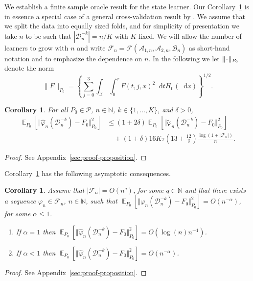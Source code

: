 \documentclass{statsoc}
\numberwithin{theorem}{section}
\newtheorem{corollary}[theorem]{Corollary}
\DeclareMathOperator{\E}{\mathbb{E}} %
\newcommand{\N}{\mathbb{N}}
\newcommand{\blank}{\makebox[1ex]{\textbf{$\cdot$}}}
\renewcommand{\phi}{\varphi}
\newcommand*\diff{\mathop{}\!\mathrm{d}}
\newcommand\bigO{\textit{O}}
\newcommand{\1}{\mathds{1}}
\newcommand{\data}{\ensuremath{\mathcal{D}}}
\begin{document}
We establish a finite sample oracle result for the state learner.
Our Corollary~\ref{cor:oracle-prop} is in essence a special case of a
general cross-validation result by \cite{vaart2006oracle}. We assume
that we split the data into equally sized folds, and for simplicity of
presentation we take \( n \) to be such that
\( |\data_n^{-k}| = n/K \) with \( K \) fixed. We will allow the
number of learners to grow with \( n \) and write
\( \mathcal{F}_n=\mathcal{F}(\mathcal{A}_{1,n}, \mathcal{A}_{2,n},
\mathcal{B}_n)\) as short-hand notation and to emphasize the
dependence on \( n \).
In the following we let \( \| \blank \|_{P_0} \) denote the norm
\begin{equation}
  \label{eq:norm}
  \| F \|_{P_0} = 
  \left\{
    \sum_{j=0}^{3}\int_{\mathcal{X}} \int_0^{\tau} F(t, j, x)^2 \diff t H_0( \diff x)
  \right\}^{1/2}.
\end{equation}
\begin{corollary}
  \label{cor:oracle-prop}
  For all \(P_0\in\mathcal{P}\), \( n \in \N \), \( k \in \{1, \dots, K\} \),
  and $\delta>0$,
  \begin{align*}
    \E_{P_0}{\left[ \Vert \hat{\phi}_n(\data_n^{-k}) - F_0 \Vert_{P_0}^2 \right]}
    & \leq (1 + 2\delta)
      \E_{P_0}{\left[ \Vert \tilde{\phi}_n(\data_n^{-k}) - F_0 \Vert_{P_0}^2 \right]}
    \\
    & \quad
      + (1+ \delta) 16   K \tau
      \left(
      13 + \frac{12}{\delta}
      \right)
      \frac{\log(1 + |\mathcal{F}_n|)}{n}.
  \end{align*}
\end{corollary}
\begin{proof}
  See Appendix~\ref{sec:proof-proposition}.
\end{proof}

Corollary~\ref{cor:oracle-prop} has the following asymptotic consequences.

\begin{corollary}
  \label{cor:asymp-cons}
  Assume that \( |\mathcal{F}_n| = \bigO(n^q)\), for some \( q \in \N \)
  and that there exists a sequence \( \phi_n \in \mathcal{F}_n \),
  \( n \in \N \), such that
  \( \E_{P_0}{\left[ \Vert \phi_n(\data_n^{-k}) - F_{0} \Vert_{P_0}^2 \right]} =
  \bigO(n^{-\alpha}) \), for some \( \alpha\leq 1 \).
  \begin{enumerate}[label=(\roman*), topsep=0pt]
  \item If $\alpha=1$ then
    \( \E_{P_0}{\left[ \Vert \hat{\phi}_n(\data_n^{-k}) - F_0 \Vert_{P_0}^2
      \right]} = \bigO(\log(n)n^{-1}) \).
  \item If $\alpha<1$ then
    \( \E_{P_0}{\left[ \Vert \hat{\phi}_n(\data_n^{-k}) - F_0 \Vert_{P_0}^2 \right]} =
    \bigO(n^{-\alpha}) \).
  \end{enumerate}
\end{corollary}
\begin{proof}
  See Appendix~\ref{sec:proof-proposition}.
\end{proof}
\end{document}
